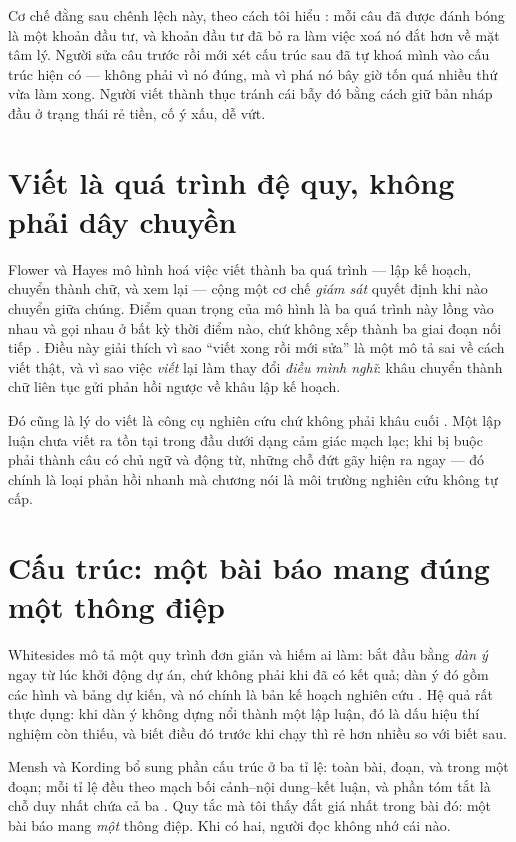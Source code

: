 \documentclass[../hieu-suat.tex]{subfiles}
\begin{document}
\begin{trucgiac}
Cơ chế đằng sau chênh lệch này, theo cách tôi hiểu \nM{}: mỗi câu đã được đánh bóng là một khoản đầu tư, và khoản đầu tư đã bỏ ra làm việc xoá nó đắt hơn về mặt tâm lý. Người sửa câu trước rồi mới xét cấu trúc sau đã tự khoá mình vào cấu trúc hiện có --- không phải vì nó đúng, mà vì phá nó bây giờ tốn quá nhiều thứ vừa làm xong. Người viết thành thục tránh cái bẫy đó bằng cách giữ bản nháp đầu ở trạng thái rẻ tiền, cố ý xấu, dễ vứt.
\end{trucgiac}

\section{Viết là quá trình đệ quy, không phải dây chuyền}

Flower và Hayes \cite{flower1981} mô hình hoá việc viết thành ba quá trình --- lập kế hoạch, chuyển thành chữ, và xem lại --- cộng một cơ chế \emph{giám sát} quyết định khi nào chuyển giữa chúng. Điểm quan trọng của mô hình là ba quá trình này lồng vào nhau và gọi nhau ở bất kỳ thời điểm nào, chứ không xếp thành ba giai đoạn nối tiếp \nT{}. Điều này giải thích vì sao ``viết xong rồi mới sửa'' là một mô tả sai về cách viết thật, và vì sao việc \emph{viết} lại làm thay đổi \emph{điều mình nghĩ}: khâu chuyển thành chữ liên tục gửi phản hồi ngược về khâu lập kế hoạch.

Đó cũng là lý do viết là công cụ nghiên cứu chứ không phải khâu cuối \nM{}. Một lập luận chưa viết ra tồn tại trong đầu dưới dạng cảm giác mạch lạc; khi bị buộc phải thành câu có chủ ngữ và động từ, những chỗ đứt gãy hiện ra ngay --- đó chính là loại phản hồi nhanh mà chương  nói là môi trường nghiên cứu không tự cấp.

\section{Cấu trúc: một bài báo mang đúng một thông điệp}

Whitesides \cite{whitesides2004} mô tả một quy trình đơn giản và hiếm ai làm: bắt đầu bằng \emph{dàn ý} ngay từ lúc khởi động dự án, chứ không phải khi đã có kết quả; dàn ý đó gồm các hình và bảng dự kiến, và nó chính là bản kế hoạch nghiên cứu \nT{}. Hệ quả rất thực dụng: khi dàn ý không dựng nổi thành một lập luận, đó là dấu hiệu thí nghiệm còn thiếu, và biết điều đó trước khi chạy thì rẻ hơn nhiều so với biết sau.

Mensh và Kording \cite{mensh2017} bổ sung phần cấu trúc ở ba tỉ lệ: toàn bài, đoạn, và trong một đoạn; mỗi tỉ lệ đều theo mạch bối cảnh--nội dung--kết luận, và phần tóm tắt là chỗ duy nhất chứa cả ba \nT{}. Quy tắc mà tôi thấy đắt giá nhất trong bài đó: một bài báo mang \emph{một} thông điệp. Khi có hai, người đọc không nhớ cái nào.
\end{document}
